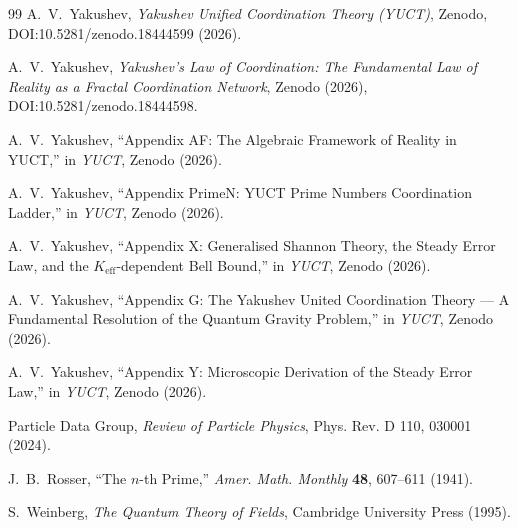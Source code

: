 \documentclass[12pt,a4paper]{article}
\theoremstyle{remark}
\begin{document}
	\begin{thebibliography}{99}
		A.~V.~Yakushev, \emph{Yakushev Unified Coordination Theory (YUCT)}, Zenodo, DOI:10.5281/zenodo.18444599 (2026).
		
		A.~V.~Yakushev, \emph{Yakushev's Law of Coordination: The Fundamental Law of Reality as a Fractal Coordination Network}, Zenodo (2026), DOI:10.5281/zenodo.18444598.
		
		A.~V.~Yakushev, ``Appendix AF: The Algebraic Framework of Reality in YUCT,'' in \emph{YUCT}, Zenodo (2026).
		
		A.~V.~Yakushev, ``Appendix PrimeN: YUCT Prime Numbers Coordination Ladder,'' in \emph{YUCT}, Zenodo (2026).
		
		A.~V.~Yakushev, ``Appendix X: Generalised Shannon Theory, the Steady Error Law, and the \(K_{\mathrm{eff}}\)-dependent Bell Bound,'' in \emph{YUCT}, Zenodo (2026).
		
		A.~V.~Yakushev, ``Appendix G: The Yakushev United Coordination Theory --- A Fundamental Resolution of the Quantum Gravity Problem,'' in \emph{YUCT}, Zenodo (2026).
		
		A.~V.~Yakushev, ``Appendix Y: Microscopic Derivation of the Steady Error Law,'' in \emph{YUCT}, Zenodo (2026).
		
		Particle Data Group, \emph{Review of Particle Physics}, Phys. Rev. D 110, 030001 (2024).
		
		J.~B.~Rosser, ``The \(n\)-th Prime,'' \emph{Amer. Math. Monthly} \textbf{48}, 607--611 (1941).
		
		S.~Weinberg, \emph{The Quantum Theory of Fields}, Cambridge University Press (1995).
	\end{thebibliography}
	
\end{document}
